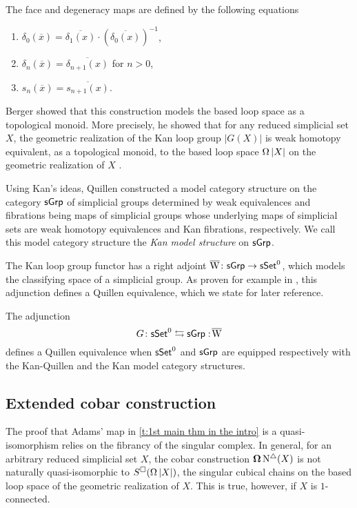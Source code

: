The face and degeneracy maps are defined by the following equations
\begin{enumerate}
    \item $\delta_0(\overline{x}) = \overline{\delta_1(x)} \cdot (\overline{\delta_0(x)})^{-1}$,
    \item $\delta_n(\overline{x})= \overline{\delta_{n+1}(x)}$ for $n >0$,
    \item $s_n(\overline{x})= \overline{s_{n+1}(x)}$.
\end{enumerate}

Berger showed that this construction models the based loop space as a topological monoid.
More precisely, he showed that for any reduced simplicial set $X$, the geometric realization of the Kan loop group $|G(X)|$ is weak homotopy equivalent, as a topological monoid, to the based loop space $\operatorname{\Omega}|X|$ on the geometric realization of $X$ \cite{berger1995loops}.

Using Kan's ideas, Quillen constructed a model category structure on the category $\mathsf{sGrp}$ of simplicial groups determined by
weak equivalences and fibrations being maps of simplicial groups whose underlying maps of simplicial sets are weak homotopy equivalences and Kan fibrations, respectively. 
We call this model category structure the \textit{Kan model structure} on $\mathsf{sGrp}$.

The Kan loop group functor has a right adjoint $\operatorname{\overline{W}} \colon \mathsf{sGrp} \to \mathsf{sSet}^0$, which models the classifying space of a simplicial group.
As proven for example in \cite[Chapter V]{goerss2009simplicial}, this adjunction defines a Quillen equivalence, which we state for later reference.

\begin{proposition} \label{p:kan adjuntion}
    The adjunction
	\begin{equation*}
	G \colon \mathsf{sSet}^0 \leftrightarrows \mathsf{sGrp} :\! \operatorname{\overline{W}}
	\end{equation*}
	defines a Quillen equivalence when $\mathsf{sSet}^0$ and $\mathsf{sGrp}$ are equipped respectively with the Kan-Quillen and the Kan model category structures.
\end{proposition}

\subsection{Extended cobar construction}

The proof that Adams' map in \cref{t:1st main thm in the intro} is a quasi-isomorphism relies on the fibrancy of the singular complex.
In general, for an arbitrary reduced simplicial set $X$, the cobar construction $\operatorname{\mathbf{\Omega}} \operatorname{N^{\triangle}}(X)$ is not naturally quasi-isomorphic to $S^{\square}(\operatorname{\Omega}|X|)$, the singular cubical chains on the based loop space of the geometric realization of $X$.
This is true, however, if $X$ is $1$-connected.


